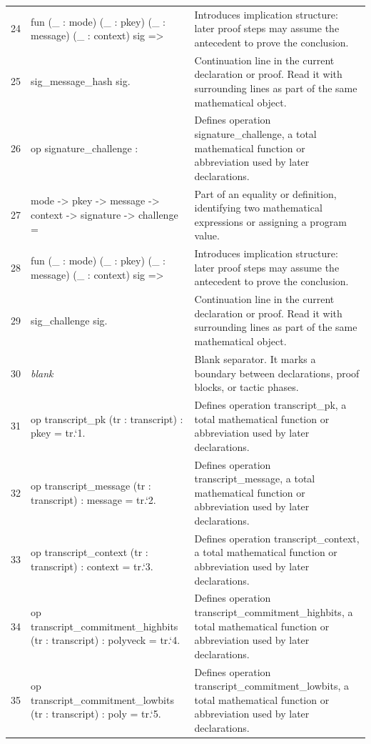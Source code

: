 \documentclass[10pt]{article}
\begin{document}
\begin{longtable}{r L{0.53\textwidth} L{0.37\textwidth}}
24 & {\ttfamily\scriptsize   fun (\_ : mode) (\_ : pkey) (\_ : message) (\_ : context) sig =>} & Introduces implication structure: later proof steps may assume the antecedent to prove the conclusion. \\
25 & {\ttfamily\scriptsize     sig\_message\_hash sig.} & Continuation line in the current declaration or proof.  Read it with surrounding lines as part of the same mathematical object. \\
26 & {\ttfamily\scriptsize op signature\_challenge :} & Defines operation signature\_challenge, a total mathematical function or abbreviation used by later declarations. \\
27 & {\ttfamily\scriptsize   mode -> pkey -> message -> context -> signature -> challenge =} & Part of an equality or definition, identifying two mathematical expressions or assigning a program value. \\
28 & {\ttfamily\scriptsize   fun (\_ : mode) (\_ : pkey) (\_ : message) (\_ : context) sig =>} & Introduces implication structure: later proof steps may assume the antecedent to prove the conclusion. \\
29 & {\ttfamily\scriptsize     sig\_challenge sig.} & Continuation line in the current declaration or proof.  Read it with surrounding lines as part of the same mathematical object. \\
30 & {\ttfamily\scriptsize \emph{blank}} & Blank separator.  It marks a boundary between declarations, proof blocks, or tactic phases. \\
31 & {\ttfamily\scriptsize op transcript\_pk (tr : transcript) : pkey = tr.`1.} & Defines operation transcript\_pk, a total mathematical function or abbreviation used by later declarations. \\
32 & {\ttfamily\scriptsize op transcript\_message (tr : transcript) : message = tr.`2.} & Defines operation transcript\_message, a total mathematical function or abbreviation used by later declarations. \\
33 & {\ttfamily\scriptsize op transcript\_context (tr : transcript) : context = tr.`3.} & Defines operation transcript\_context, a total mathematical function or abbreviation used by later declarations. \\
34 & {\ttfamily\scriptsize op transcript\_commitment\_highbits (tr : transcript) : polyveck = tr.`4.} & Defines operation transcript\_commitment\_highbits, a total mathematical function or abbreviation used by later declarations. \\
35 & {\ttfamily\scriptsize op transcript\_commitment\_lowbits (tr : transcript) : poly = tr.`5.} & Defines operation transcript\_commitment\_lowbits, a total mathematical function or abbreviation used by later declarations. \\

\end{longtable}
\end{document}
